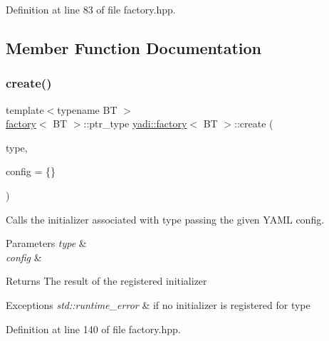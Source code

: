 Definition at line 83 of file factory.\+hpp.



\subsection{Member Function Documentation}
\mbox{\label{structyadi_1_1factory_a600474900d2c6fa5d09935a641298bd5}} 
\subsubsection{\texorpdfstring{create()}{create()}}
{\footnotesize\ttfamily template$<$typename BT $>$ \\
\hyperlink{structyadi_1_1factory}{factory}$<$ BT $>$\+::ptr\+\_\+type \hyperlink{structyadi_1_1factory}{yadi\+::factory}$<$ BT $>$\+::create (\begin{DoxyParamCaption}\item[{std\+::string const \&}]{type,  }\item[{Y\+A\+M\+L\+::\+Node const \&}]{config = {\ttfamily \{\}} }\end{DoxyParamCaption})\hspace{0.3cm}{\ttfamily [static]}}



Calls the initializer associated with type passing the given Y\+A\+ML config. 


\begin{DoxyParams}{Parameters}
{\em type} & \\
\hline
{\em config} & \\
\hline
\end{DoxyParams}
\begin{DoxyReturn}{Returns}
The result of the registered initializer 
\end{DoxyReturn}

\begin{DoxyExceptions}{Exceptions}
{\em std\+::runtime\+\_\+error} & if no initializer is registered for type \\
\hline
\end{DoxyExceptions}


Definition at line 140 of file factory.\+hpp.

\mbox{\label{structyadi_1_1factory_a512c17ea9ca1bde8dec81c22b08e5278}} 
